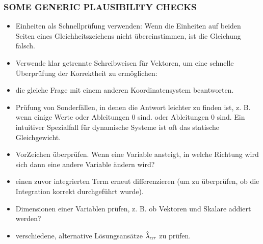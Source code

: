 \subsubsection{SOME GENERIC PLAUSIBILITY CHECKS}
\begin{itemize}
\item Einheiten als Schnellprüfung verwenden: Wenn die Einheiten auf beiden Seiten eines Gleichheitszeichens nicht übereinstimmen, ist die Gleichung 
falsch.
\item Verwende klar getrennte Schreibweisen für Vektoren, um eine schnelle Überprüfung der Korrektheit zu ermöglichen: 
    \item die gleiche Frage mit einem anderen Koordinatensystem beantworten.
    \item  Prüfung von Sonderfällen, in denen die Antwort leichter zu finden ist, z. B. wenn einige Werte oder Ableitungen 0 sind. 
oder Ableitungen 0 sind. Ein intuitiver Spezialfall für dynamische Systeme ist oft das statische Gleichgewicht. 
    \item VorZeichen überprüfen. Wenn eine Variable ansteigt, in welche Richtung wird sich dann eine andere Variable ändern wird?
    \item  einen zuvor integrierten Term erneut differenzieren (um zu überprüfen, ob die Integration korrekt durchgeführt wurde). 
        \item Dimensionen einer Variablen prüfen, z. B. ob Vektoren und Skalare addiert werden?
    \item  verschiedene, alternative Lösungsansätze $\hat{\mathit{\lambda}}_{\alpha r}$ zu prüfen.
\end{itemize}

